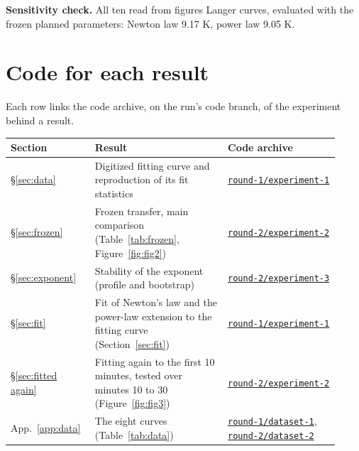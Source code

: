 \documentclass[11pt,letterpaper]{article}
\begin{document}
\textbf{Sensitivity check.} All ten read from figures Langer curves, evaluated with the frozen planned parameters: Newton law 9.17 K, power law 9.05 K.

\section{Code for each result}\label{app:code}

Each row links the code archive, on the run's code branch, of the experiment behind a result.

\begin{longtable}{p{0.22\linewidth}p{0.38\linewidth}p{0.32\linewidth}}
  \toprule
  Section & Result & Code archive \\
  \midrule
  \endhead
  \S\ref{sec:data} & Digitized fitting curve and reproduction of its fit statistics & \href{https://github.com/ai-inventor-papers/ai-invention-5821c4-newtons-cooling-law-for-coffee-over-30/tree/main/round-1/experiment-1}{\texttt{round-1/experiment-1}} \\
  \S\ref{sec:frozen} & Frozen transfer, main comparison (Table~\ref{tab:frozen}, Figure~\ref{fig:fig2}) & \href{https://github.com/ai-inventor-papers/ai-invention-5821c4-newtons-cooling-law-for-coffee-over-30/tree/main/round-2/experiment-2}{\texttt{round-2/experiment-2}} \\
  \S\ref{sec:exponent} & Stability of the exponent (profile and bootstrap) & \href{https://github.com/ai-inventor-papers/ai-invention-5821c4-newtons-cooling-law-for-coffee-over-30/tree/main/round-2/experiment-3}{\texttt{round-2/experiment-3}} \\
  \S\ref{sec:fit} & Fit of Newton's law and the power-law extension to the fitting curve (Section~\ref{sec:fit}) & \href{https://github.com/ai-inventor-papers/ai-invention-5821c4-newtons-cooling-law-for-coffee-over-30/tree/main/round-1/experiment-1}{\texttt{round-1/experiment-1}} \\
  \S\ref{sec:fitted again} & Fitting again to the first 10 minutes, tested over minutes 10 to 30 (Figure~\ref{fig:fig3}) & \href{https://github.com/ai-inventor-papers/ai-invention-5821c4-newtons-cooling-law-for-coffee-over-30/tree/main/round-2/experiment-2}{\texttt{round-2/experiment-2}} \\
  App.~\ref{app:data} & The eight curves (Table~\ref{tab:data}) & \href{https://github.com/ai-inventor-papers/ai-invention-5821c4-newtons-cooling-law-for-coffee-over-30/tree/main/round-1/dataset-1}{\texttt{round-1/dataset-1}}, \href{https://github.com/ai-inventor-papers/ai-invention-5821c4-newtons-cooling-law-for-coffee-over-30/tree/main/round-2/dataset-2}{\texttt{round-2/dataset-2}} \\

\end{longtable}
\end{document}
